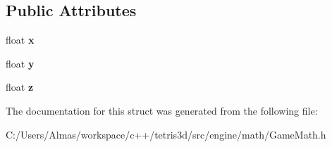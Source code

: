 \subsection*{Public Attributes}
\begin{DoxyCompactItemize}
\item 
\hypertarget{struct_vector3f_a4aca0751716b7099b397e8c63b16bfcf}{float {\bfseries x}}\label{struct_vector3f_a4aca0751716b7099b397e8c63b16bfcf}

\item 
\hypertarget{struct_vector3f_a8a602e2ee75126feb520c2aa27e7eff5}{float {\bfseries y}}\label{struct_vector3f_a8a602e2ee75126feb520c2aa27e7eff5}

\item 
\hypertarget{struct_vector3f_a470cff51eb6463672be518f5af4e26db}{float {\bfseries z}}\label{struct_vector3f_a470cff51eb6463672be518f5af4e26db}

\end{DoxyCompactItemize}


The documentation for this struct was generated from the following file\-:\begin{DoxyCompactItemize}
\item 
C\-:/\-Users/\-Almas/workspace/c++/tetris3d/src/engine/math/Game\-Math.\-h\end{DoxyCompactItemize}
